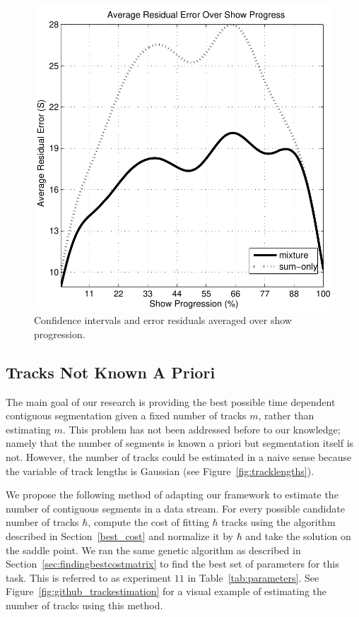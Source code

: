 \documentclass[twocolumn]{article}
\begin{document}
\begin{figure}
	\includegraphics[scale=0.4]{images/conf/residualsagainstprogress}
	
	\caption{Confidence intervals and error residuals averaged over show progression.}
	\label{fig:confidence_intervals}
	
\end{figure}


\subsection{Tracks Not Known A Priori}\label{sec:trackcount}

The main goal of our research is providing the best possible time dependent contiguous segmentation given a fixed number of tracks $m$, rather than estimating $m$. This problem has not been addressed before to our knowledge; namely that the number of segments is known a priori but segmentation itself is not. However, the number of tracks could be estimated in a naive sense because the variable of track lengths is Gaussian (see Figure~\ref{fig:tracklengths}). 

We propose the following method of adapting our framework to estimate the number of contiguous segments in a data stream. For every possible candidate number of tracks $\hbar$, compute the cost of fitting $\hbar$ tracks using the algorithm described in Section~\ref{best_cost} and normalize it by $\hbar$ and take the solution on the saddle point. We ran the same genetic algorithm as described in Section~\ref{sec:findingbestcostmatrix} to find the best set of parameters for this task. This is referred to as experiment $11$ in Table~\ref{tab:parameters}. See Figure~\ref{fig:github_trackestimation} for a visual example of estimating the number of tracks using this method. 
\end{document}
